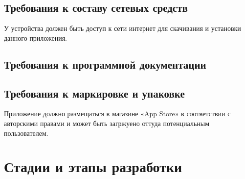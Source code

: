 \documentclass{../TechDoc}
\begin{document}
    \subsection{Требования к составу сетевых средств}
    
    У устройства должен быть доступ к сети интернет для скачивания и установки данного приложения.

    \subsection{Требования к программной документации}

        

    \subsection{Требования к маркировке и упаковке}
    
    Приложение должно размещаться в магазине «App Store» в соответствии с авторскими правами и может быть загржуено оттуда потенциальным пользователем.

    \section{Стадии и этапы разработки}
    
\end{document}
